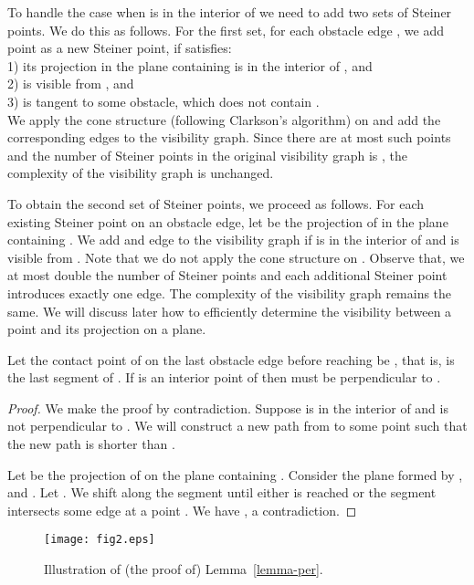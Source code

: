 \documentclass{llncs}
\begin{document}
To handle the case when  is in the interior of  we need to add two sets of Steiner points.
We do this as follows.
For the first set, for each obstacle edge , we add point  as a new Steiner point, if  satisfies:\\
1) its projection  in the plane containing  is in the interior of , and \\
2)  is visible from , and\\
3)  is tangent to some obstacle, which does not contain . \\
We apply the cone structure (following Clarkson's algorithm) on  and add the corresponding edges to the visibility graph. Since there are at most  such points and the number of Steiner points in the original visibility graph is , the complexity of the visibility graph is unchanged.

To obtain the second set of Steiner points, we proceed as follows.
For each existing Steiner point  on an obstacle edge, let  be the projection of  in the plane containing . We add  and edge  to the visibility graph if  is in the interior of  and  is visible from . Note that we do not apply the cone structure on . Observe that, we at most double the number of Steiner points
and each additional Steiner point introduces exactly one edge. The complexity of the visibility graph remains the same. We will discuss later how to efficiently determine the visibility between a point and its projection on a plane.

\begin{lemma}
\label{lemma-per}
Let the contact point of  on the last obstacle edge before reaching  be , that is,
 is the last segment of . If  is an interior point of  then
 must be perpendicular to .
\end{lemma}

\begin{proof}
We make the proof by contradiction. Suppose  is in the interior of  and  is
not perpendicular to . We will construct a new path from  to some point 
such that the new path is shorter than .

Let  be the projection of  on the plane  containing . Consider the plane
formed by ,  and . Let . We shift  along the segment  until either  is
reached or the segment  intersects some edge  at a point . We have , a contradiction.

\hfill 
\end{proof}
\begin{figure}\vspace*{-0.35in}
    \begin{center}
    \leavevmode
\texttt{[image: fig2.eps]}
    \caption{Illustration of (the proof of) Lemma~\ref{lemma-per}.}
    \label{fig2}
    \end{center}
    \vspace*{-0.35in}
\end{figure}
\end{document}
